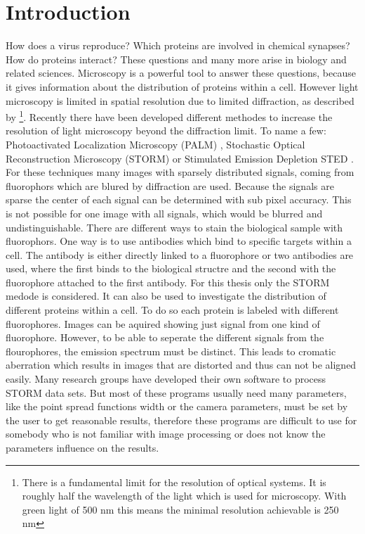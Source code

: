 \chapter{Introduction}
How does a virus reproduce? Which proteins are involved in chemical synapses? How do proteins interact? These questions and many more arise in biology and related sciences. Microscopy is a powerful tool to answer these questions, because it gives information about the distribution of proteins within a cell. However light microscopy is limited in spatial resolution due to limited diffraction, as described by \cite{Abbe} \footnote{There is a fundamental limit for the resolution of optical systems. It is roughly half the wavelength of the light which is used for microscopy. With green light of 500 nm this means the minimal resolution achievable is 250 nm}. Recently there have been developed different methodes to increase the resolution of light microscopy beyond the diffraction limit. To name a few: Photoactivated Localization Microscopy (PALM) \cite{Palm}, Stochastic Optical Reconstruction Microscopy (STORM) \cite{Storm} or Stimulated Emission Depletion STED \cite{sted}. For these techniques many images with sparsely distributed signals, coming from fluorophors which are blured by diffraction are used. Because the signals are sparse the center of each signal can be determined with sub pixel accuracy. This is not possible for one image with all signals, which would be blurred and undistinguishable. There are different ways to stain the biological sample with fluorophors. One way is to use antibodies which bind to specific targets within a cell. The antibody is either directly linked to a fluorophore or two antibodies are used, where the first binds to the biological structre and the second with the fluorophore attached to the first antibody. 
\newline
For this thesis only the STORM medode is considered. It can also be used to investigate the distribution of different proteins within a cell. To do so each protein is labeled with different fluorophores. Images can be aquired showing just signal from one kind of fluorophore. However, to be able to seperate the different signals from the flourophores, the emission spectrum must be distinct. This leads to cromatic aberration which results in images that are distorted and thus can not be aligned easily.\newline 
Many research groups have developed their own software to process STORM data sets. But most of these programs usually need many parameters, like the point spread functions width or the camera parameters, must be set by the user to get reasonable results, therefore these programs are difficult to use for somebody who is not familiar with image processing or does not know the parameters influence on the results.\newline

